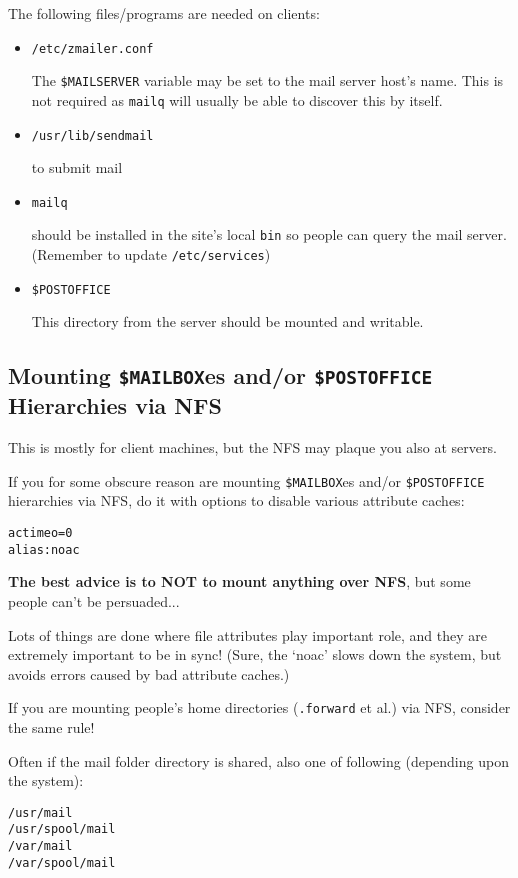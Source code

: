 \begin{multicols}{2}
The following files/programs are needed on clients:
\begin{itemize}
\item {\tt /etc/zmailer.conf}

The {\tt \$MAILSERVER} variable may be set to the mail server host's name.
This is not required as {\tt mailq} will usually be able to discover this
by itself.

\vspace{1pt}
\item {\tt /usr/lib/sendmail}

to submit mail

\vspace{1pt}
\item {\tt mailq}

should be installed in the site's local {\tt bin} so people
can query the mail server. (Remember to update {\tt /etc/services})

\vspace{1pt}
\item {\tt \$POSTOFFICE}

This directory from the server should be mounted and writable.
\end{itemize}


\subsection{Mounting {\tt \$MAILBOX}es and/or {\tt \$POSTOFFICE} Hierarchies via NFS}

This is mostly for client machines,
but the NFS may plaque you also at servers.

If you for some obscure reason are mounting {\tt \$MAILBOX}es
and/or {\tt \$POSTOFFICE} hierarchies via NFS, do it with
options to disable various attribute caches:
\begin{alltt}
              actimeo=0
    alias:    noac
\end{alltt}

{\bf The best advice is to NOT to mount anything over NFS},
but some people can't be persuaded...

Lots of things are done where file attributes play important
role, and they are extremely important to be in sync!
(Sure, the `noac' slows down the system, but avoids errors
caused by bad attribute caches.)

If you are mounting people's home directories ({\tt .forward} et al.)
via NFS, consider the same rule!

Often if the mail folder directory is shared, also
one of following (depending upon the system):
\begin{alltt}
    /usr/mail
    /usr/spool/mail
    /var/mail
    /var/spool/mail
\end{alltt}



\end{multicols}
